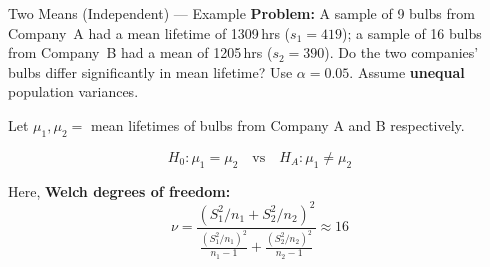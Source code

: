 \documentclass[12pt, aspectratio=169]{beamer}
\begin{document}
    \begin{frame}{Two Means (Independent) --- Example}
        \textbf{Problem:} A sample of 9 bulbs from Company~A had a mean lifetime of
        1309\,hrs ($s_1 = 419$); a sample of 16 bulbs from Company~B had a mean of
        1205\,hrs ($s_2 = 390$).
        Do the two companies' bulbs differ significantly in mean lifetime?
        Use $\alpha = 0.05$. Assume \textbf{unequal} population variances.

        \vspace{0.8em}

        Let $\mu_1, \mu_2 = $ mean lifetimes of bulbs from Company A and B respectively.

        \[
            H_0: \mu_1 = \mu_2 \quad \text{vs} \quad H_A: \mu_1 \neq \mu_2
        \]


        \vspace{1em}
        Here, \textbf{Welch degrees of freedom:}
                \[
                    \nu = \frac{(S_1^2/n_1 + S_2^2/n_2)^2}
                               {\frac{(S_1^2/n_1)^2}{n_1-1}+\frac{(S_2^2/n_2)^2}{n_2-1}}
                    \approx 16
                \]
    \end{frame}
\end{document}
